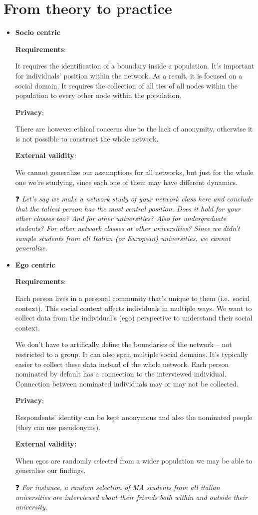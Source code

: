 \documentclass[
  notitlepage,
  onecolumn,
  openany]{book}
\begin{document}
\hypertarget{from-theory-to-practice}{%
\section{From theory to practice}\label{from-theory-to-practice}}

\begin{itemize}
\item
  \textbf{Socio centric}

  \textbf{Requirements}:

  It requires the identification of a boundary inside a population. It's important for individuals' position within the network. As a result, it is focused on a social domain. It requires the collection of all ties of all nodes within the population to every other node within the population.

  \textbf{Privacy}:

  There are however ethical concerns due to the lack of anonymity, otherwise it is not possible to construct the whole network.

  \textbf{External validity}:

  We cannot generalize our assumptions for all networks, but just for the whole one we're studying, since each one of them may have different dynamics.

  ❓ \emph{Let's say we make a network study of your network class here and conclude that the tallest person has the most central position. Does it hold for your other classes too? And for other universities? Also for undergraduate students? For other network classes at other universities? Since we didn't sample students from all Italian (or European) universities, we cannot generalize.}
\item
  \textbf{Ego centric}

  \textbf{Requirements}:

  Each person lives in a personal community that's unique to them (i.e.~social context). This social context affects individuals in multiple ways. We want to collect data from the individual's (ego) perspective to understand their social context.

  We don't have to artifically define the boundaries of the network -- not restricted to a group. It can also span multiple social domains. It's typically easier to collect these data instead of the whole network. Each person nominated by default has a connection to the interviewed individual. Connection between nominated individuals may or may not be collected.

  \textbf{Privacy}:

  Respondents' identity can be kept anonymous and also the nominated people (they can use pseudonyms).

  \textbf{External validity:}

  When egos are randomly selected from a wider population we may be able to generalise our findings.

  ❓ \emph{For instance, a random selection of MA students from all italian universities are interviewed about their friends both within and outside their university.}
\end{itemize}
\end{document}
